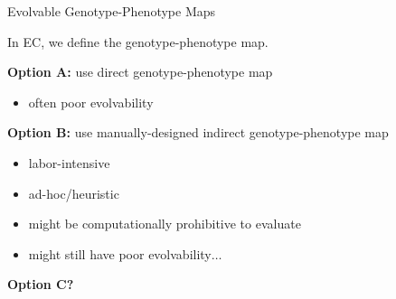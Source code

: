 \begin{frame}{Evolvable Genotype-Phenotype Maps}

\Large

\textcolor{h2}{
In EC, we define the genotype-phenotype map.
}
\normalsize

\vspace{1ex}

\pause

\textbf{Option A:} use direct genotype-phenotype map
\pause
\begin{itemize}
\item often poor evolvability
\end{itemize}

\pause

\textbf{Option B:} use manually-designed indirect genotype-phenotype map
\pause
\begin{itemize}
\item labor-intensive
\item ad-hoc/heuristic
\item might be computationally prohibitive to evaluate
\item might still have poor evolvability$\dots$
\end{itemize}

\pause

\textbf{Option C?}

\end{frame}
